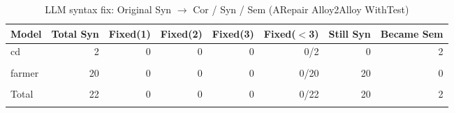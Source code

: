 \begin{table}[h]
\centering
\caption{LLM syntax fix: Original Syn $\rightarrow$ Cor / Syn / Sem (ARepair Alloy2Alloy WithTest)}
\label{tab:syn_fix_arepairalloy2alloywithtest}
\begin{tabular}{|l|r|r|r|r|r|r|r|}
\hline
Model & Total Syn & Fixed(1) & Fixed(2) & Fixed(3) & Fixed($<$3) & Still Syn & Became Sem \\
\hline
cd & 2 & 0 & 0 & 0 & 0/2 & 0 & 2 \\\\
\hline
farmer & 20 & 0 & 0 & 0 & 0/20 & 20 & 0 \\\\
\hline
Total & 22 & 0 & 0 & 0 & 0/22 & 20 & 2 \\\\
\hline
\end{tabular}
\end{table}

